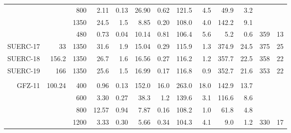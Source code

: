 \documentclass[authoryear,review,12pt]{elsarticle}
\begin{document}
\begin{table}
\begin{tabular}{|r|rrrrrrrrrrrr|}
          &       & 800   & 2.11  & 0.13  & 26.90 & 0.62  & 121.5 & 4.5   & 49.9  & 3.2   &       &  \\
          &       & 1350  & 24.5  & 1.5   & 8.85  & 0.20  & 108.0 & 4.0   & 142.2 & 9.1   &       &  \\
      &       & 480   & 0.73  & 0.04  & 10.14 & 0.81  & 106.4 & 5.6   & 5.2   & 0.6   & 359   & 13 \\
    SUERC-17  & 33    & 1350  & 31.6  & 1.9   & 15.04 & 0.29  & 115.9 & 1.3   & 374.9 & 24.5  & 375   & 25 \\
    SUERC-18 & 156.2 & 1350  & 26.7  & 1.6   & 16.56 & 0.27  & 116.2 & 1.2   & 357.7 & 22.5  & 358   & 22 \\
    SUERC-19 & 166   & 1350  & 25.6  & 1.5   & 16.99 & 0.17  & 116.8 & 0.9   & 352.7 & 21.6  & 353   & 22 \\
          &       &       &       &       &       &       &       &       &       &       &       &  \\
    GFZ-11 & 100.24 & 400   & 0.96  & 0.13  & 152.0 & 16.0  & 263.0 & 18.0  & 142.9 & 13.7  &       &  \\
          &       & 600   & 3.30  & 0.27  & 38.3  & 1.2   & 139.6 & 3.1   & 116.6 & 8.6   &       &  \\
          &       & 800   & 12.57 & 0.94  & 7.87  & 0.16  & 108.2 & 1.0   & 61.8  & 4.8   &       &  \\
          &       & 1200  & 3.33  & 0.30  & 5.66  & 0.34  & 104.3 & 4.1   & 9.0     & 1.2   & 330   & 17 \\
    \hline
    \end{tabular}
\end{table}
\end{document}
